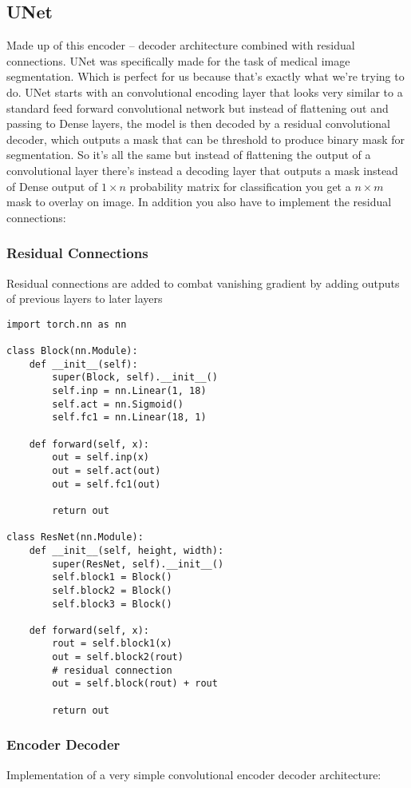\documentclass[11pt]{article}
\begin{document}
\subsection{UNet}
Made up of this encoder -- decoder architecture combined with residual connections. UNet was specifically made for the task of medical image segmentation. \cite{r2015} Which is perfect for us because that's exactly what we're trying to do. UNet starts with an convolutional encoding layer that looks very similar to a standard feed forward convolutional network but instead of flattening out and passing to Dense layers, the model is then decoded by a residual convolutional decoder, which outputs a mask that can be threshold to produce binary mask for segmentation.
So it's all the same but instead of flattening the output of a convolutional layer there's instead a decoding layer that outputs a mask instead of Dense output of \(1\times n\) probability matrix for classification you get a \(n\times m\) mask to overlay on image. In addition you also have to implement the residual connections:

\subsubsection{Residual Connections}
Residual connections are added to combat vanishing gradient by adding outputs of previous layers to later layers
\begin{verbatim}
import torch.nn as nn

class Block(nn.Module):
    def __init__(self):
        super(Block, self).__init__()
        self.inp = nn.Linear(1, 18)
        self.act = nn.Sigmoid()
        self.fc1 = nn.Linear(18, 1)

    def forward(self, x):
        out = self.inp(x)
        out = self.act(out)
        out = self.fc1(out)

        return out

class ResNet(nn.Module):
    def __init__(self, height, width):
        super(ResNet, self).__init__()
        self.block1 = Block()
        self.block2 = Block()
        self.block3 = Block()

    def forward(self, x):
        rout = self.block1(x)
        out = self.block2(rout)
        # residual connection
        out = self.block(rout) + rout

        return out
\end{verbatim}

\subsubsection{Encoder Decoder}
Implementation of a very simple convolutional encoder decoder architecture:
\end{document}
